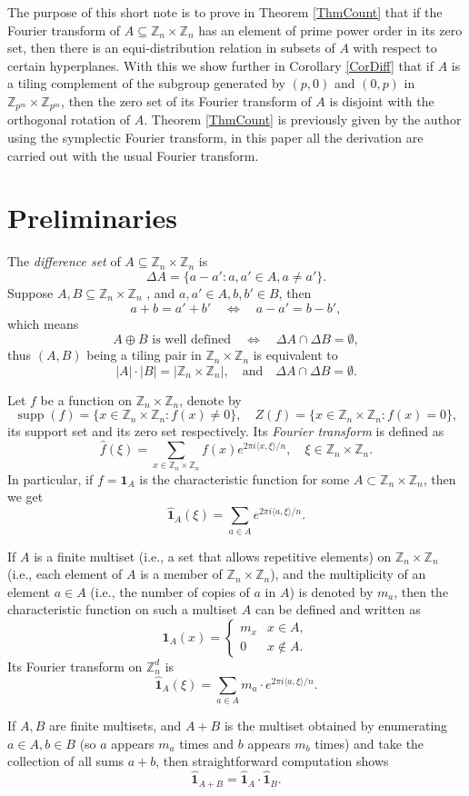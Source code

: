 \documentclass[A4, 11pt]{article}
\DeclareMathOperator{\supp}{supp}
\newcommand{\bra}[1]{\langle#1\rangle}
\newcommand{\G}[1]{\mathbb Z_{#1}\times\mathbb Z_{#1}}
\newcommand{\F}[1]{\widehat{\mathbf 1}_{#1}}
\begin{document}
The purpose of this short note is to prove in Theorem \ref{ThmCount} that if the Fourier transform of $A\subseteq\G{n}$ has an element of prime power order in its zero set, then there is an equi-distribution relation in subsets of $A$ with respect to certain hyperplanes. With this we show further in Corollary \ref{CorDiff} that if $A$ is a tiling complement of the subgroup generated by $(p,0)$ and $(0,p)$ in $\G{p^m}$, then the zero set of its Fourier transform of $A$ is disjoint with the orthogonal rotation of $A$. Theorem \ref{ThmCount} is previously given by the author using the symplectic Fourier transform, in this paper all the derivation are carried out with the usual Fourier transform.

\section{Preliminaries} 
The \emph{difference set} of $A\subseteq\G{n}$ is
$$\Delta A=\{a-a': a,a'\in A, a\neq a'\}.$$
Suppose $A,B\subseteq\G{n}$ , and $a,a'\in A, b,b'\in B$, then
$$a+b=a'+b' \quad\Leftrightarrow\quad a-a'=b-b',$$
which means
$$A\oplus B \text{ is well defined} \quad\Leftrightarrow\quad \Delta A\cap \Delta B=\emptyset,$$
thus $(A,B)$ being a tiling pair in $\G{n}$ is equivalent to
$$|A|\cdot |B|=|\G{n}|, \quad\text{and}\quad \Delta A\cap \Delta B=\emptyset.$$

Let $f$ be a function on $\G{n}$, denote by  
$$\supp(f)=\{x\in\G{n}: f(x)\neq 0\}, \quad Z(f)=\{x\in\G{n}: f(x)=0\},$$
its support set and its zero set respectively. Its \emph{Fourier transform} is defined as
$$\widehat{f}(\xi)=\sum_{x\in \G{n}}f(x)e^{2\pi i\bra{x,\xi}/n}, \quad \xi\in\G{n}.$$
In particular, if $f=\mathbf 1_A$ is the characteristic function for some $A\subset\G{n}$, then we get
$$\F{A}(\xi)=\sum_{a\in A}e^{2\pi i\bra{a,\xi}/n}.$$

If $A$ is a finite multiset (i.e., a set that allows repetitive elements) on $\G{n}$ (i.e., each element of $A$ is a member of $\G{n}$), and the multiplicity of an element $a\in A$ (i.e., the number of copies of $a$ in $A$) is denoted by $m_a$, then the characteristic function on such a multiset $A$ can be defined and written as
$$\mathbf 1_A(x)=\begin{cases}m_x & x\in A, \\ 0 & x\notin A. \end{cases}$$
Its Fourier transform on $\mathbb Z_n^d$ is 
$$\F{A}(\xi)=\sum_{a\in A}m_a\cdot e^{2\pi i\bra{a,\xi}/n}.$$

If $A,B$ are finite multisets, and $A+B$ is the multiset obtained by enumerating $a\in A, b\in B$ (so $a$ appears $m_a$ times and $b$ appears $m_b$ times) and take the collection of all sums $a+b$, then straightforward computation shows
$$\F{A+B}=\F{A}\cdot \F{B}.$$
\end{document}
